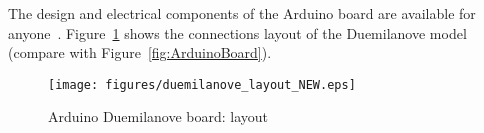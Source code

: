 The design and electrical components of the Arduino board are available for anyone~\cite{Arduino}. Figure~\ref{fig:Arduino_schematics} shows the connections layout of the Duemilanove model (compare with Figure~\ref{fig:ArduinoBoard}).

\begin{figure}[htbp]
  \centering
  \texttt{[image: figures/duemilanove\_layout\_NEW.eps]}
  \caption{Arduino Duemilanove board: layout
  \label{fig:Arduino_schematics}}
\end{figure}